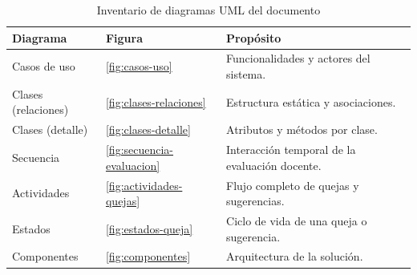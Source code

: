 \begin{table}[H]
\centering
\caption{Inventario de diagramas \ac{UML} del documento}
\label{tab:inventario-uml}
\small
\begin{tabularx}{\textwidth}{@{}p{3.1cm} p{2.2cm} X@{}}
\toprule
\rowcolor{verdeClaro}
\textbf{Diagrama} & \textbf{Figura} & \textbf{Propósito} \\
\midrule
Casos de uso & \ref{fig:casos-uso} & Funcionalidades y actores del sistema. \\
Clases (relaciones) & \ref{fig:clases-relaciones} & Estructura estática y asociaciones. \\
Clases (detalle) & \ref{fig:clases-detalle} & Atributos y métodos por clase. \\
Secuencia & \ref{fig:secuencia-evaluacion} & Interacción temporal de la evaluación docente. \\
Actividades & \ref{fig:actividades-quejas} & Flujo completo de quejas y sugerencias. \\
Estados & \ref{fig:estados-queja} & Ciclo de vida de una queja o sugerencia. \\
Componentes & \ref{fig:componentes} & Arquitectura de la solución. \\
\bottomrule
\end{tabularx}
\end{table}